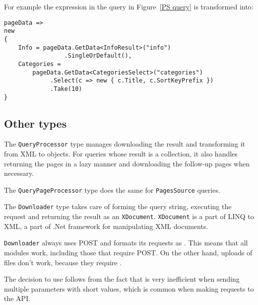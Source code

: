 
For example the expression in the query in Figure~\ref{PS query} is transformed into:

\begin{lstlisting}
pageData =>
new
{
    Info = pageData.GetData<InfoResult>("info")
    		     .SingleOrDefault(),
    Categories =
    	pageData.GetData<CategoriesSelect>("categories")
    		 .Select(c => new { c.Title, c.SortKeyPrefix })
    		 .Take(10)
}
\end{lstlisting}

\subsection{Other types}

The \lstinline{QueryProcessor} type manages downloading the result and transforming it from XML to objects.
For queries whose result is a collection, it also handles returning the pages in a lazy manner
and downloading the follow-up pages when necessary.

The \lstinline{QueryPageProcessor} type does the same for \lstinline{PagesSource} queries.

\medskip

The \lstinline{Downloader} type takes care of forming the query string, executing the request and
returning the result as an \lstinline{XDocument}.
\lstinline{XDocument} is a part of LINQ to XML, a part of .Net framework for manipulating XML documents.

\lstinline{Downloader} always uses POST and formats its requests as .
This means that all modules work, including those that require POST.
On the other hand, uploads of files don't work, because they require .

The decision to use  follows from the fact that
 is very inefficient when sending multiple parameters with short values,
which is common when making requests to the API.